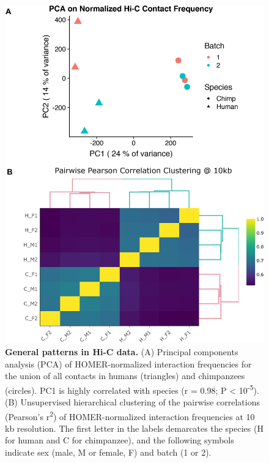 \begin{figure}
\centering
\includegraphics[width=6in]{img/fig1.PNG}
\caption[General patterns in Hi-C data.]{\textbf{General patterns in Hi-C data.} (A) Principal components analysis (PCA) of HOMER-normalized interaction frequencies for the union of all contacts in humans (triangles) and chimpanzees (circles). PC1 is highly correlated with species (r = 0.98; P {\textless} 10\textsuperscript{-5}). (B) Unsupervised hierarchical clustering of the pairwise correlations (Pearson's r\textsuperscript{2}) of HOMER-normalized interaction frequencies at 10 kb resolution. The first letter in the labels demarcates the species (H for human and C for chimpanzee), and the following symbols indicate sex (male, M or female, F) and batch (1 or 2).}
\label{fig:ch02-fig1}
\end{figure}

